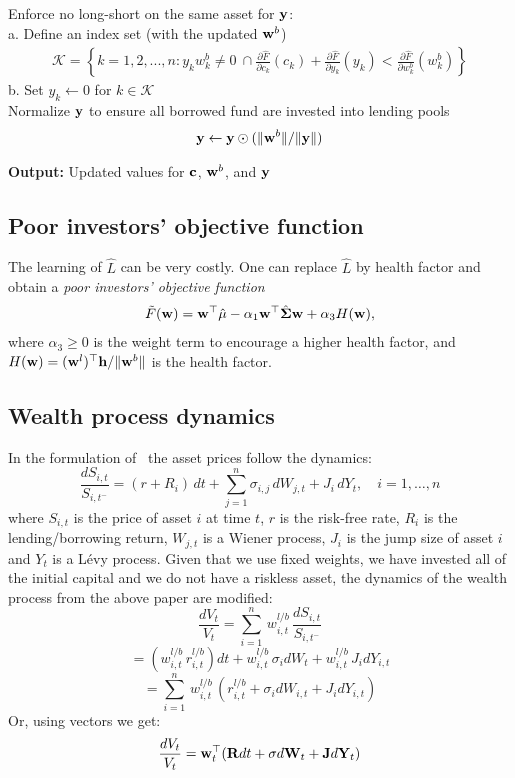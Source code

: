 \documentclass{article} %
\newcommand{\INDSTATE}[1][1]{\hspace{#1\algorithmicindent}}
\theoremstyle{plain}
\theoremstyle{definition} %
\begin{document}
\begin{algorithm}[th]
\begin{algorithmic}[1]
    \STATE Enforce no long-short on the same asset for ${\bf y}$:\\
    \INDSTATE a. Define an index set (with the updated ${\bf w}^b$)
    \begin{align*} 
      \mathcal{K} = \left\{
        k=1,2,...,n: y_k w^b_k\neq 0\ \cap 
      \frac{\partial \hat F}{\partial c_k}(c_k) + \frac{\partial \hat F}{\partial y_k}(y_k) < \frac{\partial \hat F}{\partial w^b_k}(w^b_k)
      \right\}
    \end{align*}
    \INDSTATE b. Set $y_k \leftarrow 0$ for $k \in \mathcal{K}$\\
    
    \STATE Normalize ${\bf y}$ to ensure all borrowed fund are invested into lending pools
     \begin{align*}{\bf y} \leftarrow {\bf y} \odot (\|{\bf w}^b\|/ \|{\bf y}\|)\end{align*}
    
    \STATE \textbf{Output:} Updated values for ${\bf c}$, ${\bf w}^b$, and ${\bf y}$
    \end{algorithmic}
  \end{algorithm}


\subsection{Poor investors' objective function}
The learning of $\hat L$ can be very costly. 
 One can replace $\hat L$ by health factor and obtain a \textit{poor investors' objective function}
 \begin{align}
  \tilde F({\bf w}) = {\bf w}^\top \hat {\bf \mu} - \alpha_1 {\bf w}^\top \hat {\bf \Sigma}{\bf w} + \alpha_3 H({\bf w}),
 \end{align}
 where $\alpha_3 \geq 0$ is the weight term to encourage a higher health factor, and $H({\bf w}) = ({\bf w}^l)^\top{\bf h}/\|{\bf w}^b\|$ is the health factor. 

 \subsection{Wealth process dynamics}
 In the formulation of~\cite{Ait_Sahalia_2009} the asset prices follow the dynamics:
 \[
\frac{dS_{i,t}}{S_{i,t^-}} = (r + R_i)\,dt + \sum_{j=1}^n \sigma_{i,j} \, dW_{j,t} + J_i \, dY_t, \quad i = 1, \dots, n
\]
where $S_{i,t}$ is the price of asset $i$ at time $t$, $r$ is the risk-free rate, $R_i$ is the lending/borrowing return, $W_{j,t}$ is a Wiener process, $J_i$ is the jump size of asset $i$ 
and $Y_t$ is a Lévy process.
Given that we use fixed weights, we have invested all of the initial capital and we do not have a riskless asset, the dynamics of the wealth process from the above paper are modified:
\[
\frac{dV_t}{V_t} = \sum_{i=1}^n \, w^{l/b}_{i,t} \, \frac{dS_{i,t}}{S_{i,t^-}}
\]
\[
=(w^{l/b}_{i,t} \,r^{l/b}_{i,t})dt + w^{l/b}_{i,t} \, \sigma_i dW_t + w^{l/b}_{i,t}\, J_i dY_{i,t}
\]
\[
= \sum_{i=1}^n \, w^{l/b}_{i,t} \, (r^{l/b}_{i,t} + \sigma_i dW_{i,t} + J_i dY_{i,t} )
\]
Or, using vectors we get:
\[
\frac{dV_t}{V_t} = {\bf{w}}_t^\top ( {\bf{R}}dt + {\bf{\sigma}} d{\bf{W}}_t + {\bf{J}} d {\bf{Y}}_t) 
\]
\end{document}
